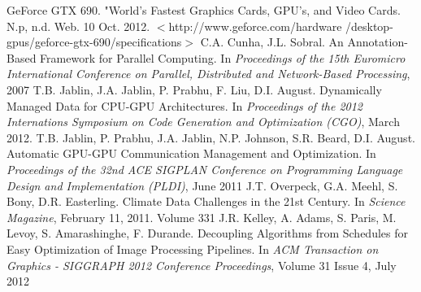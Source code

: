 \documentclass[a4paper,12pt]{article}
\begin{document}
\newpage
\begin{thebibliography}{9}
 GeForce GTX 690. "World's Fastest Graphics Cards, GPU's, and Video Cards. N.p, n.d. Web. 10 Oct. 2012.
 $<$http://www.geforce.com/hardware /desktop-gpus/geforce-gtx-690/specifications$>$
 C.A. Cunha, J.L. Sobral. An Annotation-Based Framework for Parallel Computing. In \textit{Proceedings of the 15th Euromicro International Conference on Parallel, Distributed and Network-Based Processing}, 2007
 T.B. Jablin, J.A. Jablin, P. Prabhu, F. Liu, D.I. August. Dynamically Managed Data for CPU-GPU Architectures. In \textit{Proceedings of the 2012 Internations Symposium on Code Generation and Optimization (CGO)}, March 2012.
T.B. Jablin, P. Prabhu, J.A. Jablin, N.P. Johnson, S.R. Beard, D.I. August. Automatic GPU-GPU Communication Management and Optimization. In \textit{Proceedings of the 32nd ACE SIGPLAN Conference on Programming Language Design and Implementation (PLDI)}, June 2011
 J.T. Overpeck, G.A. Meehl, S. Bony, D.R. Easterling.  Climate Data Challenges in the 21st Century.  In \textit{Science Magazine}, February 11, 2011.  Volume 331
 J.R. Kelley, A. Adams, S. Paris, M. Levoy, S. Amarashinghe, F. Durande.  Decoupling Algorithms from Schedules for Easy Optimization of Image Processing Pipelines.  In \textit{ACM Transaction on Graphics - SIGGRAPH 2012 Conference Proceedings}, Volume 31 Issue 4, July 2012
\end{thebibliography}
\end{document}
